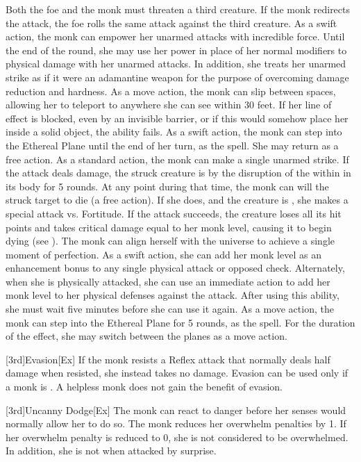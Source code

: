 Both the foe and the monk must threaten a third creature.
If the monk redirects the attack, the foe rolls the same attack against the third creature.
As a swift action, the monk can empower her unarmed attacks with incredible force.
Until the end of the round, she may use her \ki power in place of her normal modifiers to physical damage with her unarmed attacks.
In addition, she treats her unarmed strike as if it were an adamantine weapon for the purpose of overcoming damage reduction and hardness.
As a move action, the monk can slip between spaces, allowing her to teleport to anywhere she can see within 30 feet.
If her line of effect is blocked, even by an invisible barrier, or if this would somehow place her inside a solid object, the ability fails.
 As a swift action, the monk can step into the Ethereal Plane until the end of her turn, as the 
spell.
She may return as a free action.
As a standard action, the monk can make a single unarmed strike.
If the attack deals damage, the struck creature is \sickened by the disruption of the \ki within in its body for 5 rounds.
At any point during that time, the monk can will the struck target to die (a free action).
If she does, and the creature is \bloodied, she makes a special attack vs. Fortitude.
If the attack succeeds, the creature loses all its hit points and takes critical damage equal to her monk level, causing it to begin dying (see ).
The monk can align herself with the universe to achieve a single moment of perfection.
As a swift action, she can add her monk level as an enhancement bonus to any single physical attack or opposed check.
Alternately, when she is physically attacked, she can use an immediate action to add her monk level to her physical defenses against the attack.
After using this ability, she must wait five minutes before she can use it again.
 As a move action, the monk can step into the Ethereal Plane for 5 rounds, as the 
spell.
For the duration of the effect, she may switch between the planes as a move action.

[3rd]{Evasion}[Ex]
If the monk resists a Reflex attack that normally deals half damage when resisted, she instead takes no damage.
Evasion can be used only if a monk is \unencumbered.
A helpless monk does not gain the benefit of evasion.

[3rd]{Uncanny Dodge}[Ex]
The monk can react to danger before her senses would normally allow her to do so.
The monk reduces her overwhelm penalties by 1.
If her overwhelm penalty is reduced to 0, she is not considered to be overwhelmed.
In addition, she is not \unaware when attacked by surprise.

